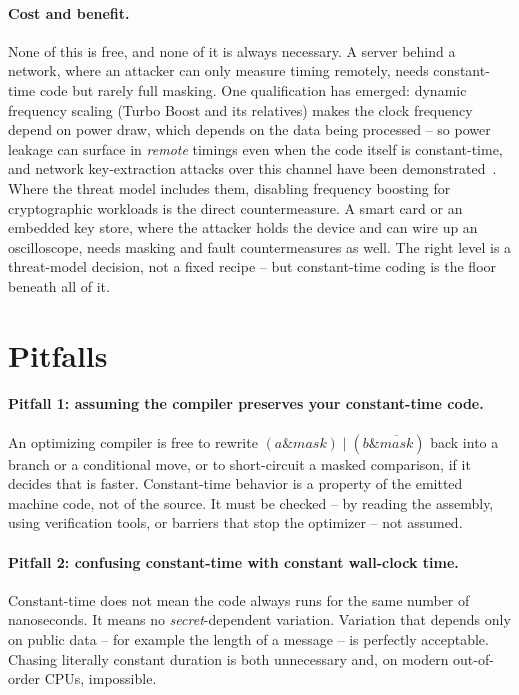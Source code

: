 \paragraph{Cost and benefit.}
None of this is free, and none of it is always necessary. A server behind a network,
where an attacker can only measure timing remotely, needs constant-time code but rarely
full masking. One qualification has emerged: dynamic frequency scaling (Turbo Boost
and its relatives) makes the clock frequency depend on power draw, which depends on
the data being processed -- so power leakage can surface in \emph{remote} timings even
when the code itself is constant-time, and network key-extraction attacks over this
channel have been demonstrated~\cite{hertzbleed2022}. Where the threat model includes
them, disabling frequency boosting for cryptographic workloads is the direct
countermeasure. A smart card or an embedded key store, where the attacker holds the
device and can wire up an oscilloscope, needs masking and fault countermeasures as
well. The right level is a threat-model decision, not a fixed recipe -- but
constant-time coding is the floor beneath all of it.

\section{Pitfalls}

\paragraph{Pitfall 1: assuming the compiler preserves your constant-time code.}
An optimizing compiler is free to rewrite $(a \mathbin{\&} mask)\mathbin{|}(b
\mathbin{\&}\overline{mask})$ back into a branch or a conditional move, or to
short-circuit a masked comparison, if it decides that is faster. Constant-time
behavior is a property of the emitted machine code, not of the source. It must be
checked -- by reading the assembly, using verification tools, or barriers that stop the
optimizer -- not assumed.

\paragraph{Pitfall 2: confusing constant-time with constant wall-clock time.}
Constant-time does not mean the code always runs for the same number of nanoseconds.
It means no \emph{secret}-dependent variation. Variation that depends only on public
data -- for example the length of a message -- is perfectly
acceptable. Chasing literally constant duration is both unnecessary and, on modern
out-of-order CPUs, impossible.

